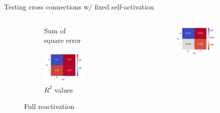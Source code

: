 \documentclass[aspectratio=169,9pt]{beamer}
\begin{document}
\begin{frame}{Testing cross connections w/ fixed self-activation}
\begin{columns}
\begin{column}{0.3\textwidth}
\begin{figure}[h]
\begin{subfigure}[b]{\textwidth}
                            \caption{Sum of square error}
                        \end{subfigure}
                        \begin{subfigure}[b]{\textwidth}
                            \centering
                            \includegraphics[width=\textwidth]{vary_cross-AA-iPSC_timeshifted-rsq-hmap}
                            \caption{$R^2$ values}
                        \end{subfigure}
                    \caption{Full reactivation}
                \end{figure}
            \end{column}
            \pause
            \begin{column}{0.3\textwidth}
                \begin{figure}[h]
                        \centering
                        \begin{subfigure}[b]{\textwidth}
                            \centering
                            \includegraphics[width=\textwidth]{vary_cross-AA-Partial_timeshifted-sse-hmap}

\end{subfigure}
\end{figure}
\end{column}
\end{columns}
\end{frame}
\end{document}
